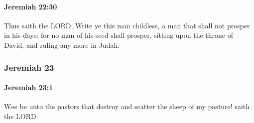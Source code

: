 		\paragraph{Jeremiah 22:30} %
			\label{JEREMIAH-22-30}

			Thus saith the LORD, Write ye this man childless, a man that shall not prosper in his days: for no man of his seed shall prosper, sitting upon the throne of David, and ruling any more in Judah.

	\subsubsection{Jeremiah 23} %
		\label{JEREMIAH-23}

		\paragraph{Jeremiah 23:1} %
			\label{JEREMIAH-23-1}

			Woe be unto the pastors that destroy and scatter the sheep of my pasture! saith the LORD.


